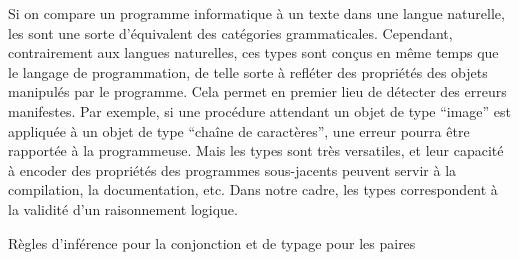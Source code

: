 Si on compare un programme informatique à un texte dans une langue naturelle,
les  sont une sorte d’équivalent des catégories grammaticales.
Cependant, contrairement aux langues naturelles, ces types sont conçus
en même temps que le langage de programmation,
de telle sorte à refléter des propriétés des objets manipulés par le programme.
Cela permet en premier lieu de détecter des erreurs manifestes.
Par exemple, si une procédure attendant un objet de type “image” est
appliquée à un objet de type “chaîne de caractères”, une erreur pourra être rapportée
à la programmeuse.
Mais les types sont très versatiles, et leur capacité à encoder
des propriétés des programmes sous-jacents peuvent servir à la compilation, la
documentation, etc. Dans notre cadre, les types correspondent à la
validité d’un raisonnement logique.

\begin{marginfigure}[2em]




  
  \caption{Règles d’inférence pour la conjonction et de typage pour les paires}
  \label{fig:curry-howard-exemple}
\end{marginfigure}


